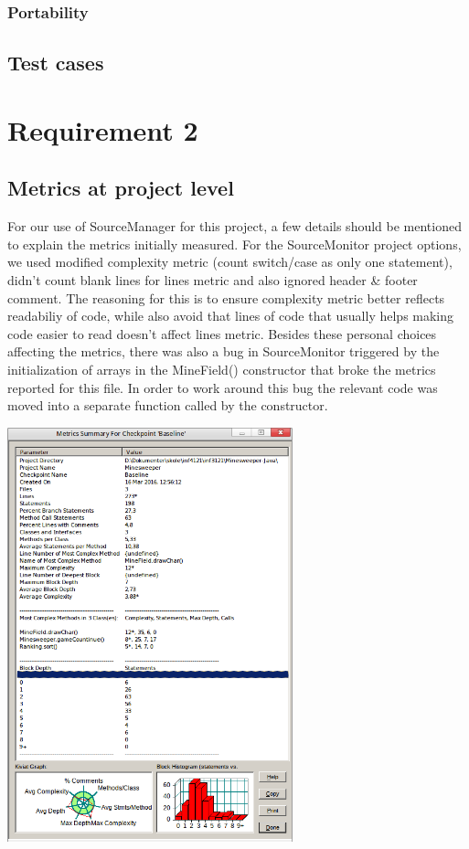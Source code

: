 \documentclass[UKenglish]{article}  %
\begin{document}
\subsubsection{Portability}

\subsection{Test cases}

\section{Requirement 2}

\subsection{Metrics at project level}
For our use of SourceManager for this project, a few details should be
mentioned to explain the metrics initially measured.
For the SourceMonitor project options, we used modified complexity metric
(count switch/case as only one statement), didn't count blank lines for lines
metric and also ignored header \& footer comment.
The reasoning for this is to ensure complexity metric better reflects
readabiliy of code, while also avoid that lines of code that usually helps
making code easier to read doesn't affect lines metric.
Besides these personal choices affecting the metrics, there was also a bug
in SourceMonitor triggered by the initialization of arrays in the MineField()
constructor that broke the metrics reported for this file. In order to work
around this bug the relevant code was moved into a separate function called by
the constructor.

\includegraphics[height=12cm]{project-metrics-summary-original.png}
\end{document}
